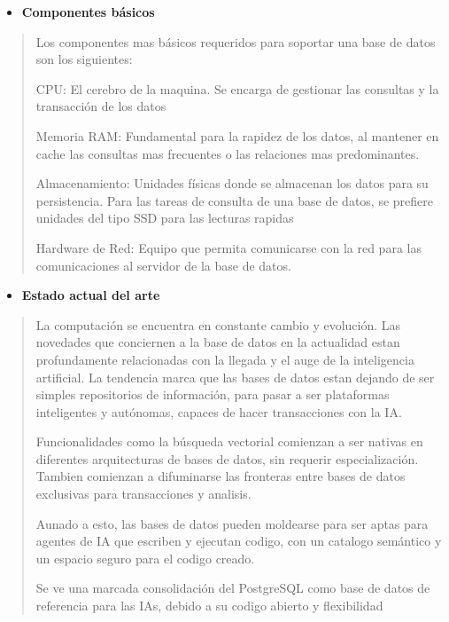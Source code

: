 \documentclass[14pt]{extarticle}
\begin{document}
\begin{itemize}
\item
  \textbf{Componentes básicos}
\end{itemize}

\begin{quote}
Los componentes mas básicos requeridos para soportar una base de datos
son los siguientes:

CPU: El cerebro de la maquina. Se encarga de gestionar las consultas y
la transacción de los datos

Memoria RAM: Fundamental para la rapidez de los datos, al mantener en
cache las consultas mas frecuentes o las relaciones mas predominantes.

Almacenamiento: Unidades físicas donde se almacenan los datos para su
persistencia. Para las tareas de consulta de una base de datos, se
prefiere unidades del tipo SSD para las lecturas rapidas

Hardware de Red: Equipo que permita comunicarse con la red para las
comunicaciones al servidor de la base de datos.
\end{quote}

\begin{itemize}
\item
  \textbf{Estado actual del arte}
\end{itemize}

\begin{quote}
La computación se encuentra en constante cambio y evolución. Las
novedades que conciernen a la base de datos en la actualidad estan
profundamente relacionadas con la llegada y el auge de la inteligencia
artificial. La tendencia marca que las bases de datos estan dejando de
ser simples repositorios de información, para pasar a ser plataformas
inteligentes y autónomas, capaces de hacer transacciones con la IA.

Funcionalidades como la búsqueda vectorial comienzan a ser nativas en
diferentes arquitecturas de bases de datos, sin requerir
especialización. Tambien comienzan a difuminarse las fronteras entre
bases de datos exclusivas para transacciones y analisis.

Aunado a esto, las bases de datos pueden moldearse para ser aptas para
agentes de IA que escriben y ejecutan codigo, con un catalogo semántico
y un espacio seguro para el codigo creado.

Se ve una marcada consolidación del PostgreSQL como base de datos de
referencia para las IAs, debido a su codigo abierto y flexibilidad
\end{quote}
\end{document}
